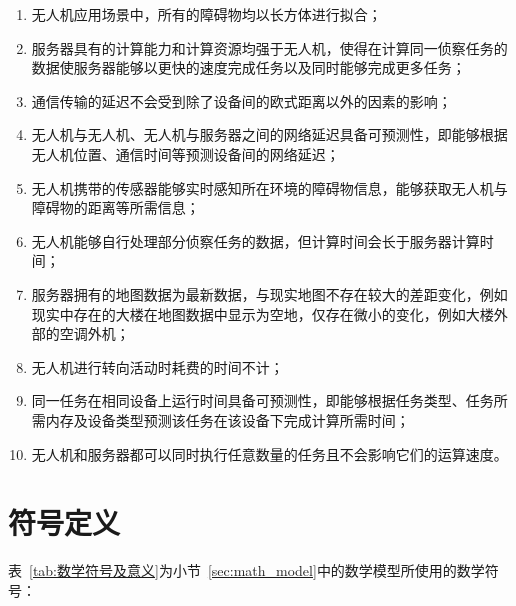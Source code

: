 \begin{enumerate}
    \item {无人机应用场景中，所有的障碍物均以长方体进行拟合；}

    \item {服务器具有的计算能力和计算资源均强于无人机，使得在计算同一侦察任务的数据使服务器能够以更快的速度完成任务以及同时能够完成更多任务；}

    \item {通信传输的延迟不会受到除了设备间的欧式距离以外的因素的影响；}

    \item {无人机与无人机、无人机与服务器之间的网络延迟具备可预测性，即能够根据无人机位置、通信时间等预测设备间的网络延迟；}

    \item {无人机携带的传感器能够实时感知所在环境的障碍物信息，能够获取无人机与障碍物的距离等所需信息；}

    \item {无人机能够自行处理部分侦察任务的数据，但计算时间会长于服务器计算时间；}

    \item {服务器拥有的地图数据为最新数据，与现实地图不存在较大的差距变化，例如现实中存在的大楼在地图数据中显示为空地，仅存在微小的变化，例如大楼外部的空调外机；}

    \item {无人机进行转向活动时耗费的时间不计；}

    \item {同一任务在相同设备上运行时间具备可预测性，即能够根据任务类型、任务所需内存及设备类型预测该任务在该设备下完成计算所需时间；}

    \item {无人机和服务器都可以同时执行任意数量的任务且不会影响它们的运算速度。}
\end{enumerate}

\section{符号定义}

表~\ref{tab:数学符号及意义}为小节~\ref{sec:math_model}中的数学模型所使用的数学符号：

